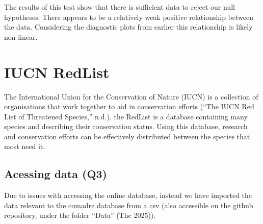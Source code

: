 \documentclass[
]{article}
\begin{document}
The results of this test show that there is sufficient data to reject
our null hypotheses. There appears to be a relatively weak positive
relationship between the data. Considering the diagnostic plots from
earlier this relationship is likely non-linear.

\section{IUCN RedList}\label{iucn-redlist}

The International Union for the Conservation of Nature (IUCN) is a
collection of organisations that work together to aid in conservation
efforts ({``The IUCN Red List of Threatened Species,''} n.d.). the
RedList is a database containing many species and describing their
conservation status. Using this database, research and conservation
efforts can be effectively distributed between the species that most
need it.

\subsection{Acessing data (Q3)}\label{acessing-data-q3}

Due to issues with accessing the online database, instead we have
imported the data relevant to the comadre database from a csv (also
accessible on the github repository, under the folder ``Data'' (The
2025)).
\end{document}
